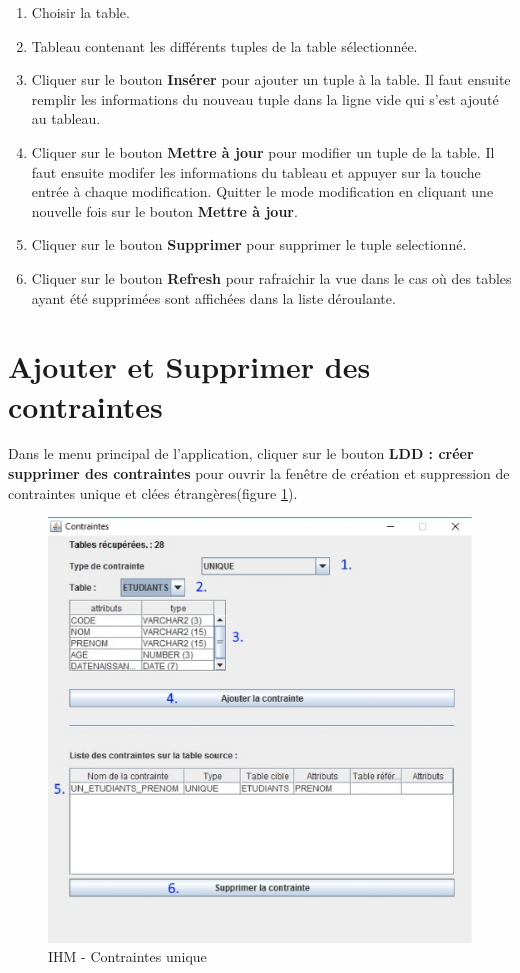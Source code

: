 \begin{enumerate}
\item Choisir la table.
\item Tableau contenant les différents tuples de la table sélectionnée.
\item Cliquer sur le bouton \textbf{Insérer} pour ajouter un tuple à la table. Il faut ensuite remplir les informations du nouveau tuple
dans la ligne vide qui s'est ajouté au tableau.
\item Cliquer sur le bouton \textbf{Mettre à jour} pour modifier un tuple de la table. Il faut ensuite modifer les informations du tableau et 
appuyer sur la touche entrée à chaque modification. Quitter le mode modification en cliquant une nouvelle fois sur le bouton \textbf{Mettre à jour}.
\item Cliquer sur le bouton \textbf{Supprimer} pour supprimer le tuple selectionné.
\item Cliquer sur le bouton \textbf{Refresh} pour rafraichir la vue dans le cas où des tables ayant été supprimées sont affichées dans la liste déroulante.
\end{enumerate}

\section{Ajouter et Supprimer des contraintes}

Dans le menu principal de l'application, cliquer sur le bouton \textbf{LDD : créer supprimer des contraintes} pour ouvrir la fen\^etre de création et suppression de contraintes unique et clées étrangères(figure \ref{contraintes_unique_gui}).

\begin{figure}[!h]
\centering
\includegraphics[width=12cm]{./images/manuel/contraintes_unique.eps}
\caption{IHM - Contraintes unique}
\label{contraintes_unique_gui}
\end{figure}

